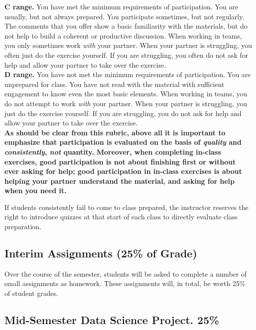 \documentclass[12pt]{article}
\begin{document}
\textbf{C range.}  You have met the minimum requirements of participation.  You are usually, but not always prepared.  You participate sometimes, but not regularly.  The comments that you offer show a basic familiarity with the materials, but do not help to build a coherent or productive discussion.  When working in teams, you only sometimes work \emph{with} your partner. When your partner is struggling, you often just do the exercise yourself. If you are struggling, you often do not ask for help and allow your partner to take over the exercise. \\

\textbf{D range.}  You have not met the minimum requirements of participation.  You are unprepared for class.  You have not read with the material with sufficient engagement to know even the most basic elements.  When working in teams, you do not attempt to work \emph{with} your partner. When your partner is struggling, you just do the exercise yourself. If you are struggling, you do not ask for help and allow your partner to take over the exercise.\\

\textbf{As should be clear from this rubric, above all it is important to emphasize that participation is evaluated on the basis of \emph{quality} and \emph{consistently}, \emph{not} quantity. Moreover, when completing in-class exercises, good participation is not about finishing first or without ever asking for help; good participation in in-class exercises is about helping your partner understand the material, and asking for help when you need it.}

If students consistently fail to come to class prepared, the instructor reserves the right to introduce quizzes at that start of each class to directly evaluate class preparation.

\subsection{Interim Assignments (25\% of Grade)}

Over the course of the semester, students will be asked to complete a number of small assignments as homework. These assignments will, in total, be worth 25\% of student grades.

\subsection{Mid-Semester Data Science Project.  25\%}
\end{document}
